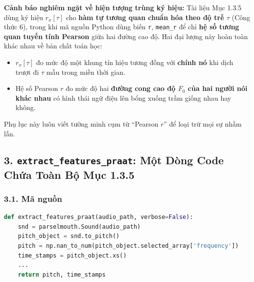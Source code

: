 \documentclass[11pt,a4paper]{article}
\begin{document}
\begin{physicalinsight}
\textbf{Cảnh báo nghiêm ngặt về hiện tượng trùng ký hiệu:}
Tài liệu Mục 1.3.5 dùng ký hiệu $r_x[\tau]$ cho \textbf{hàm tự tương quan chuẩn hóa theo độ trễ $\tau$} (Công thức 6), trong khi mã nguồn Python dùng biến \texttt{r}, \texttt{mean\_r} để chỉ \textbf{hệ số tương quan tuyến tính Pearson} giữa hai đường cao độ. Hai đại lượng này hoàn toàn khác nhau về bản chất toán học:
\begin{itemize}
    \setlength{\itemsep}{0.5pt}
    \item $r_x[\tau]$ đo mức độ một khung tín hiệu tương đồng với \textbf{chính nó} khi dịch trượt đi $\tau$ mẫu trong miền thời gian.
    \item Hệ số Pearson $r$ đo mức độ hai \textbf{đường cong cao độ $F_0$ của hai người nói khác nhau} có hình thái ngữ điệu lên bổng xuống trầm giống nhau hay không.
\end{itemize}
Phụ lục này luôn viết tường minh cụm từ ``Pearson $r$'' để loại trừ mọi sự nhầm lẫn.
\end{physicalinsight}

\subsection*{3. \texttt{extract\_features\_praat}: Một Dòng Code Chứa Toàn Bộ Mục 1.3.5}

\subsubsection*{3.1. Mã nguồn}
\begin{lstlisting}[language=Python]
def extract_features_praat(audio_path, verbose=False):
    snd = parselmouth.Sound(audio_path)
    pitch_object = snd.to_pitch()
    pitch = np.nan_to_num(pitch_object.selected_array['frequency'])
    time_stamps = pitch_object.xs()
    ...
    return pitch, time_stamps
\end{lstlisting}
\end{document}
